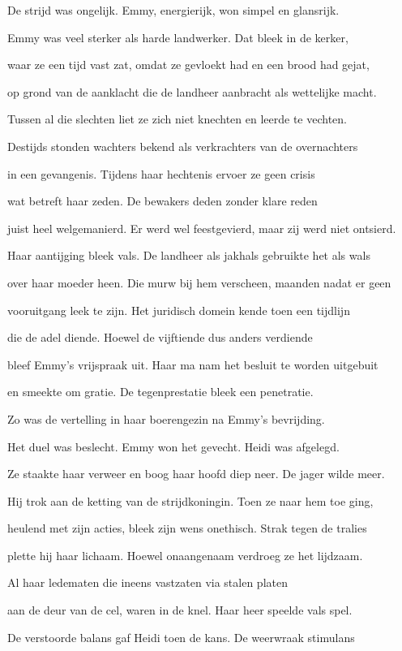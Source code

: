 De strijd was ongelijk.
Emmy, energierijk,
won simpel en glansrijk.

Emmy was veel sterker
als harde landwerker.
Dat bleek in de kerker,

waar ze een tijd vast zat,
omdat ze gevloekt had
en een brood had gejat,

op grond van de aanklacht
die de landheer aanbracht
als wettelijke macht.

Tussen al die slechten
liet ze zich niet knechten
en leerde te vechten.

Destijds stonden wachters
bekend als verkrachters
van de overnachters

in een gevangenis.
Tijdens haar hechtenis
ervoer ze geen crisis

wat betreft haar zeden.
De bewakers deden
zonder klare reden

juist heel welgemanierd.
Er werd wel feestgevierd,
maar zij werd niet ontsierd.

Haar aantijging bleek vals.
De landheer als jakhals
gebruikte het als wals

over haar moeder heen.
Die murw bij hem verscheen,
maanden nadat er geen

vooruitgang leek te zijn.
Het juridisch domein
kende toen een tijdlijn

die de adel diende.
Hoewel de vijftiende
dus anders verdiende

bleef Emmy’s vrijspraak uit.
Haar ma nam het besluit
te worden uitgebuit

en smeekte om gratie.
De tegenprestatie
bleek een penetratie.

Zo was de vertelling
in haar boerengezin
na Emmy’s bevrijding.

Het duel was beslecht.
Emmy won het gevecht.
Heidi was afgelegd.

Ze staakte haar verweer
en boog haar hoofd diep neer.
De jager wilde meer.

Hij trok aan de ketting
van de strijdkoningin.
Toen ze naar hem toe ging,

heulend met zijn acties,
bleek zijn wens onethisch.
Strak tegen de tralies

plette hij haar lichaam.
Hoewel onaangenaam
verdroeg ze het lijdzaam.

Al haar ledematen
die ineens vastzaten
via stalen platen

aan de deur van de cel,
waren in de knel.
Haar heer speelde vals spel.

De verstoorde balans
gaf Heidi toen de kans.
De weerwraak stimulans

